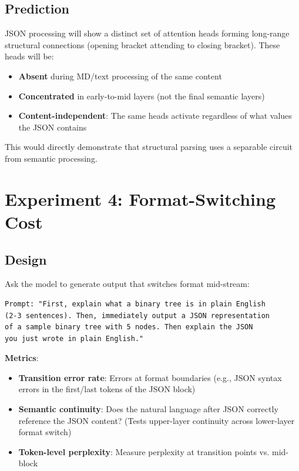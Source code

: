 \documentclass[11pt,a4paper]{article}
\begin{document}
\subsection{Prediction}

JSON processing will show a distinct set of attention heads forming long-range structural connections (opening bracket attending to closing bracket). These heads will be:
\begin{itemize}
    \item \textbf{Absent} during MD/text processing of the same content
    \item \textbf{Concentrated} in early-to-mid layers (not the final semantic layers)
    \item \textbf{Content-independent}: The same heads activate regardless of what values the JSON contains
\end{itemize}

This would directly demonstrate that structural parsing uses a separable circuit from semantic processing.

\section{Experiment 4: Format-Switching Cost}

\subsection{Design}

Ask the model to generate output that switches format mid-stream:

\begin{lstlisting}
Prompt: "First, explain what a binary tree is in plain English
(2-3 sentences). Then, immediately output a JSON representation
of a sample binary tree with 5 nodes. Then explain the JSON
you just wrote in plain English."
\end{lstlisting}

\textbf{Metrics}:
\begin{itemize}
    \item \textbf{Transition error rate}: Errors at format boundaries (e.g., JSON syntax errors in the first/last tokens of the JSON block)
    \item \textbf{Semantic continuity}: Does the natural language after JSON correctly reference the JSON content? (Tests upper-layer continuity across lower-layer format switch)
    \item \textbf{Token-level perplexity}: Measure perplexity at transition points vs. mid-block
\end{itemize}
\end{document}
